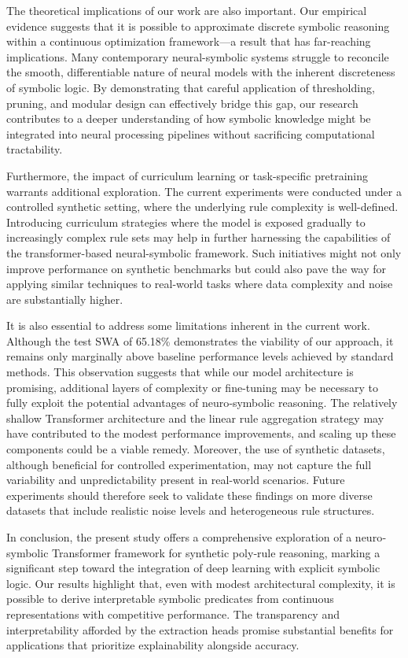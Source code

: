 \documentclass{article}
\begin{document}
The theoretical implications of our work are also important. Our empirical evidence suggests that it is possible to approximate discrete symbolic reasoning within a continuous optimization framework—a result that has far-reaching implications. Many contemporary neural-symbolic systems struggle to reconcile the smooth, differentiable nature of neural models with the inherent discreteness of symbolic logic. By demonstrating that careful application of thresholding, pruning, and modular design can effectively bridge this gap, our research contributes to a deeper understanding of how symbolic knowledge might be integrated into neural processing pipelines without sacrificing computational tractability.

Furthermore, the impact of curriculum learning or task-specific pretraining warrants additional exploration. The current experiments were conducted under a controlled synthetic setting, where the underlying rule complexity is well-defined. Introducing curriculum strategies where the model is exposed gradually to increasingly complex rule sets may help in further harnessing the capabilities of the transformer-based neural-symbolic framework. Such initiatives might not only improve performance on synthetic benchmarks but could also pave the way for applying similar techniques to real-world tasks where data complexity and noise are substantially higher.

It is also essential to address some limitations inherent in the current work. Although the test SWA of 65.18\% demonstrates the viability of our approach, it remains only marginally above baseline performance levels achieved by standard methods. This observation suggests that while our model architecture is promising, additional layers of complexity or fine-tuning may be necessary to fully exploit the potential advantages of neuro‐symbolic reasoning. The relatively shallow Transformer architecture and the linear rule aggregation strategy may have contributed to the modest performance improvements, and scaling up these components could be a viable remedy. Moreover, the use of synthetic datasets, although beneficial for controlled experimentation, may not capture the full variability and unpredictability present in real-world scenarios. Future experiments should therefore seek to validate these findings on more diverse datasets that include realistic noise levels and heterogeneous rule structures.

In conclusion, the present study offers a comprehensive exploration of a neuro‐symbolic Transformer framework for synthetic poly‐rule reasoning, marking a significant step toward the integration of deep learning with explicit symbolic logic. Our results highlight that, even with modest architectural complexity, it is possible to derive interpretable symbolic predicates from continuous representations with competitive performance. The transparency and interpretability afforded by the extraction heads promise substantial benefits for applications that prioritize explainability alongside accuracy.
\end{document}
